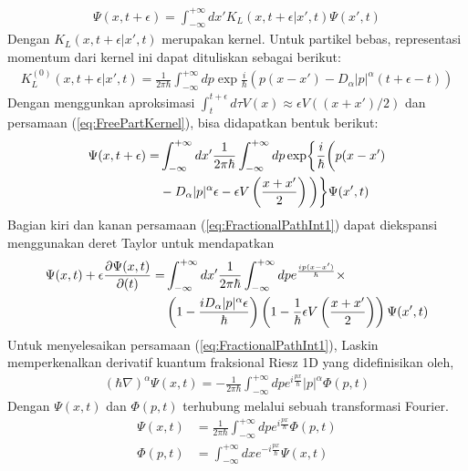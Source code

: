 \begin{align}
    \Psi(x,t+\epsilon) = \int_{-\infty}^{+\infty}dx' K_L(x,t+\epsilon |x',t) \Psi(x',t)
\end{align}
Dengan \(K_L(x,t+\epsilon |x',t)\) merupakan kernel. Untuk partikel bebas, representasi momentum dari kernel ini dapat dituliskan sebagai berikut:
\begin{align}
    K_L^{(0)}(x,t+\epsilon |x',t) = \frac{1}{2\pi\hbar} \int_{-\infty}^{+\infty}dp \exp{\frac{i}{\hbar}(p(x-x') - D_\alpha |p|^\alpha (t+\epsilon - t))} \label{eq:FreePartKernel}
\end{align}
Dengan menggunkan aproksimasi \(\int_t^{t+\epsilon} d\tau V(x) \approx \epsilon V((x+x')/2) \) dan persamaan (\ref{eq:FreePartKernel}), bisa didapatkan bentuk berikut:
\begin{align}
    \Psi(x,t+\epsilon) =& \int_{-\infty}^{+\infty}dx' \frac{1}{2\pi\hbar} \int_{-\infty}^{+\infty} dp \exp \biggl\{\frac{i}{\hbar}\biggl(p(x-x') \notag \\
    &- D_\alpha |p|^\alpha \epsilon - \epsilon V\left(\frac{x+x'}{2}\right)\biggl)\biggl\} \Psi(x',t) \label{eq:FractionalPathInt1}
\end{align}
Bagian kiri dan kanan persamaan (\ref{eq:FractionalPathInt1}) dapat diekspansi menggunakan deret Taylor untuk mendapatkan
\begin{align}
    \Psi(x,t) + \epsilon\frac{\partial\Psi(x,t)}{\partial(t)} =& \int_{-\infty}^{+\infty}dx' \frac{1}{2\pi\hbar} \int_{-\infty}^{+\infty} dp e^\frac{ip(x-x')}{\hbar} \times \notag\\
    &\left(1 - \frac{iD_\alpha |p|^\alpha \epsilon}{\hbar}\right) \left(1 - \frac{1}{\hbar}\epsilon V\left(\frac{x+x'}{2}\right)\right)\Psi(x',t) \label{eq:FractionalPathInt2}
\end{align}
Untuk menyelesaikan persamaan (\ref{eq:FractionalPathInt1}), Laskin memperkenalkan derivatif kuantum fraksional Riesz 1D yang didefinisikan oleh,
\begin{align}
    (\hbar\nabla)^\alpha \Psi(x,t) = -\frac{1}{2\pi\hbar}\int_{-\infty}^{+\infty}dpe^{i\frac{px}{\hbar}}|p|^\alpha \Phi(p,t) \label{eq:RieszDef}
\end{align}
Dengan \(\Psi(x,t)\) dan \(\Phi(p,t)\) terhubung melalui sebuah transformasi Fourier.
\begin{align}
    \Psi(x,t) &= \frac{1}{2\pi\hbar}\int_{-\infty}^{+\infty}dpe^{i\frac{px}{\hbar}}\Phi(p,t)\\
    \Phi(p,t) &= \int_{-\infty}^{+\infty}dxe^{-i\frac{px}{\hbar}}\Psi(x,t)
\end{align}
